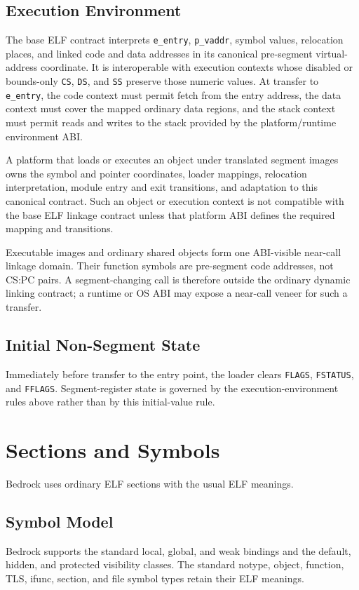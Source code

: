 \documentclass[10pt,twoside]{article}
\begin{document}
\subsection{Execution Environment}
The base ELF contract interprets \texttt{e\_entry}, \texttt{p\_vaddr}, symbol
values, relocation places, and linked code and data addresses in its canonical
pre-segment virtual-address coordinate. It is interoperable with execution
contexts whose disabled or bounds-only \texttt{CS}, \texttt{DS}, and
\texttt{SS} preserve those numeric values. At transfer to \texttt{e\_entry},
the code context must permit fetch from the entry address, the data context
must cover the mapped ordinary data regions, and the stack context must permit
reads and writes to the stack provided by the platform/runtime environment
ABI.

A platform that loads or executes an object under translated segment images
owns the symbol and pointer coordinates, loader mappings, relocation
interpretation, module entry and exit transitions, and adaptation to this
canonical contract. Such an object or execution context is not compatible with
the base ELF linkage contract unless that platform ABI defines the required
mapping and transitions.

Executable images and ordinary shared objects form one ABI-visible near-call
linkage domain. Their function symbols are pre-segment code addresses, not
CS:PC pairs. A segment-changing call is therefore outside the ordinary dynamic
linking contract; a runtime or OS ABI may expose a near-call veneer for such a
transfer.

\subsection{Initial Non-Segment State}
Immediately before transfer to the entry point, the loader clears
\texttt{FLAGS}, \texttt{FSTATUS}, and \texttt{FFLAGS}. Segment-register state
is governed by the execution-environment rules above rather than by this
initial-value rule.

\clearpage
\section{Sections and Symbols}\label{page:sections-and-symbols}
Bedrock uses ordinary ELF sections with the usual ELF meanings.
\subsection{Symbol Model}
Bedrock supports the standard local, global, and weak bindings and the
default, hidden, and protected visibility classes. The standard notype,
object, function, TLS, ifunc, section, and file symbol types retain their ELF
meanings.
\end{document}
